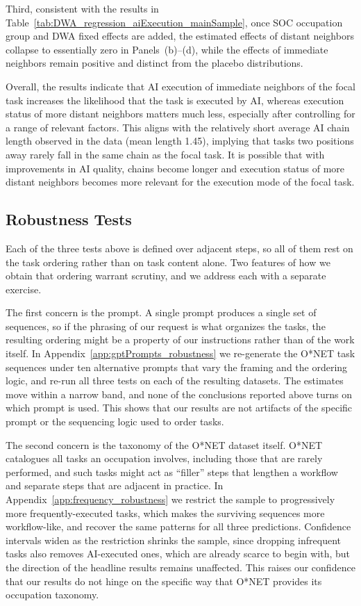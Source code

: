 Third, consistent with the results in Table~\ref{tab:DWA_regression_aiExecution_mainSample}, once SOC occupation group and DWA fixed effects are added, the estimated effects of distant neighbors collapse to essentially zero in Panels~(b)--(d), while the effects of immediate neighbors remain positive and distinct from the placebo distributions.

Overall, the results indicate that AI execution of immediate neighbors of the focal task increases the likelihood that the task is executed by AI, whereas execution status of more distant neighbors matters much less, especially after controlling for a range of relevant factors.
This aligns with the relatively short average AI chain length observed in the data (mean length 1.45), implying that tasks two positions away rarely fall in the same chain as the focal task.
It is possible that with improvements in AI quality, chains become longer and execution status of more distant neighbors becomes more relevant for the execution mode of the focal task.


\subsection{Robustness Tests}
\label{sec:robustness}

Each of the three tests above is defined over adjacent steps, so all of them rest on the task ordering rather than on task content alone.
Two features of how we obtain that ordering warrant scrutiny, and we address each with a separate exercise.

The first concern is the prompt.
A single prompt produces a single set of sequences, so if the phrasing of our request is what organizes the tasks, the resulting ordering might be a property of our instructions rather than of the work itself.
In Appendix~\ref{app:gptPrompts_robustness} we re-generate the O*NET task sequences under ten alternative prompts that vary the framing and the ordering logic, and re-run all three tests on each of the resulting datasets.
The estimates move within a narrow band, and none of the conclusions reported above turns on which prompt is used.
This shows that our results are not artifacts of the specific prompt or the sequencing logic used to order tasks.

The second concern is the taxonomy of the O*NET dataset itself.
O*NET catalogues all tasks an occupation involves, including those that are rarely performed, and such tasks might act as ``filler'' steps that lengthen a workflow and separate steps that are adjacent in practice.
In Appendix~\ref{app:frequency_robustness} we restrict the sample to progressively more frequently-executed tasks, which makes the surviving sequences more workflow-like, and recover the same patterns for all three predictions.
Confidence intervals widen as the restriction shrinks the sample, since dropping infrequent tasks also removes AI-executed ones, which are already scarce to begin with, but the direction of the headline results remains unaffected.
This raises our confidence that our results do not hinge on the specific way that O*NET provides its occupation taxonomy.

